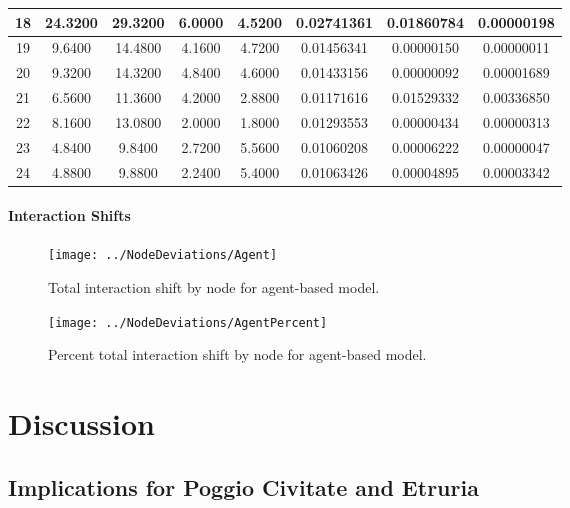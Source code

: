 \documentclass[12pt,a4paper]{thesis}
\begin{document}
\begin{table}[H]
\begin{tabular}{|c|c|c|c|c|c|c|c|}
\hline	18	&	24.3200	&	29.3200	&	6.0000	&	4.5200	&	0.02741361	&	0.01860784	&	0.00000198	\\
\hline	19	&	9.6400	&	14.4800	&	4.1600	&	4.7200	&	0.01456341	&	0.00000150	&	0.00000011	\\
\hline	20	&	9.3200	&	14.3200	&	4.8400	&	4.6000	&	0.01433156	&	0.00000092	&	0.00001689	\\
\hline	21	&	6.5600	&	11.3600	&	4.2000	&	2.8800	&	0.01171616	&	0.01529332	&	0.00336850	\\
\hline	22	&	8.1600	&	13.0800	&	2.0000	&	1.8000	&	0.01293553	&	0.00000434	&	0.00000313	\\
\hline	23	&	4.8400	&	9.8400	&	2.7200	&	5.5600	&	0.01060208	&	0.00006222	&	0.00000047	\\
\hline	24	&	4.8800	&	9.8800	&	2.2400	&	5.4000	&	0.01063426	&	0.00004895	&	0.00003342	\\
\hline
\end{tabular} 
\label{tab:agentNodeAfter}
\end{table}

\subsubsection{Interaction Shifts}

\begin{figure}[H]
\centering
\texttt{[image: ../NodeDeviations/Agent]}
\caption{Total interaction shift by node for agent-based model.}
\label{fig:Agent}
\end{figure}

\begin{figure}[H]
\centering
\texttt{[image: ../NodeDeviations/AgentPercent]}
\caption{Percent total interaction shift by node for agent-based model.}
\label{fig:AgentPercent}
\end{figure}



\chapter{Discussion}
\section{Implications for Poggio Civitate and Etruria}
\end{document}
